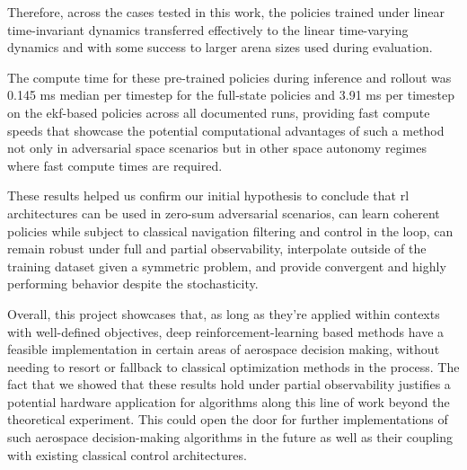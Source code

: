 Therefore, across the cases tested in this work, the policies trained under linear time-invariant dynamics transferred effectively to the linear time-varying dynamics and with some success to larger arena sizes used during evaluation. 


The compute time for these pre-trained policies during inference and rollout was 0.145 ms median per timestep for the full-state policies and 3.91 ms per timestep on the \acs{ekf}-based policies across all documented runs, providing fast compute speeds that showcase the potential computational advantages of such a method not only in adversarial space scenarios but in other space autonomy regimes where fast compute times are required.

These results helped us confirm our initial hypothesis to conclude that \acs{rl} architectures can be used in zero-sum adversarial scenarios, can learn coherent policies while subject to classical navigation filtering and control in the loop, can remain robust under full and partial observability, interpolate outside of the training dataset given a symmetric problem, and provide convergent and highly performing behavior despite the stochasticity.


Overall, this project showcases that, as long as they're applied within contexts with well-defined objectives, deep reinforcement-learning based methods have a feasible implementation in certain areas of aerospace decision making, without needing to resort or fallback to classical optimization methods in the process. The fact that we showed that these results hold under partial observability justifies a potential hardware application for algorithms along this line of work beyond the theoretical experiment. This could open the door for further implementations of such aerospace decision-making algorithms in the future as well as their coupling with existing classical control architectures.

